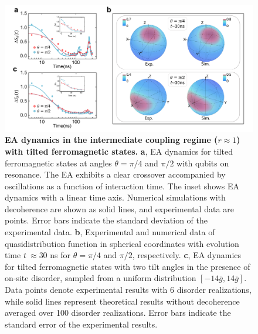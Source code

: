 \documentclass[reprint,superscriptaddress,preprintnumbers,longbibliography,
amsmath,amssymb,aps,floatfix,pra,twocolumn, tightenlines %
]{revtex4-2}
\begin{document}
     \begin{figure}[t]
         \centering
     	\includegraphics[width=1.0\linewidth]{Figure4/Figure4.pdf}
     	\caption{\textbf{EA dynamics in the intermediate coupling regime ($ r \approx 1 $) with tilted ferromagnetic states.} \textbf{a}, EA dynamics for tilted ferromagnetic states at angles \(\theta = \pi/4\) and \(\pi/2\) with qubits on resonance. The EA exhibits a clear crossover accompanied by oscillations as a function of interaction time. The inset shows EA dynamics with a linear time axis. Numerical simulations with decoherence are shown as solid lines, and experimental data are points. Error bars indicate the standard deviation of the experimental data. \textbf{b}, Experimental and numerical data of quasidistribution function in spherical coordinates with evolution time \(t~\approx30\) ns for \(\theta = \pi/4\) and \(\pi/2\), respectively. \textbf{c},	EA dynamics for tilted ferromagnetic states with two tilt angles in the presence of on-site disorder, sampled from a uniform distribution \( [-14\bar{g}, 14\bar{g}] \). Data points denote experimental results with 6 disorder realizations, while solid lines represent theoretical results without decoherence averaged over 100 disorder realizations. Error bars indicate the standard error of the experimental results.}

	\label{fig4}
     \end{figure}
\end{document}

